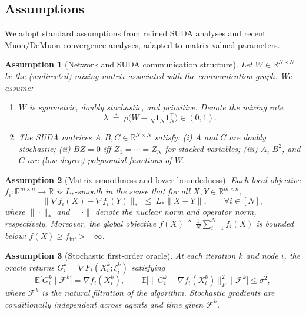 \documentclass{article}
\newtheorem{assumption}{Assumption}
\begin{document}
\subsection{Assumptions}

We adopt standard assumptions from refined SUDA analyses and recent Muon/DeMuon convergence analyses, adapted to matrix-valued parameters.

\begin{assumption}[Network and SUDA communication structure]
    \label{assump:network-suda}
    Let $W\in\mathbb{R}^{N\times N}$ be the (undirected) mixing matrix associated with the communication graph.
    We assume:
    \begin{enumerate}
        \vspace{-1mm}
        \item $W$ is symmetric, doubly stochastic, and primitive. Denote the mixing rate
        \[
            \lambda \;\triangleq\; \rho\Big(W-\tfrac{1}{N}\mathbf{1}_N\mathbf{1}_N^\top\Big)\in(0,1).
        \]
        \vspace{-1mm}
        \item The SUDA matrices $A,B,C\in\mathbb{R}^{N\times N}$ satisfy:
        (i) $A$ and $C$ are doubly stochastic; (ii) $BZ=0$ iff $Z_1=\cdots=Z_N$ for stacked variables;
        (iii) $A$, $B^2$, and $C$ are (low-degree) polynomial functions of $W$.
    \end{enumerate}
\end{assumption}

\begin{assumption}[Matrix smoothness and lower boundedness]
    \label{assump:smooth}
    Each local objective $f_i:\mathbb{R}^{m\times n}\to\mathbb{R}$ is $L_*$-smooth in the sense that for all $X,Y\in\mathbb{R}^{m\times n}$,
    \[
        \|\nabla f_i(X)-\nabla f_i(Y)\|_* \;\le\; L_* \|X-Y\|,
        \qquad \forall i\in[N],
    \]
    where $\|\cdot\|_*$ and $\|\cdot\|$ denote the nuclear norm and operator norm, respectively.
    Moreover, the global objective $f(X)\triangleq\frac{1}{N}\sum_{i=1}^N f_i(X)$ is bounded below: $f(X)\ge f_{\inf}>-\infty$.
\end{assumption}

\begin{assumption}[Stochastic first-order oracle]
    \label{assump:stoch}
    At each iteration $k$ and node $i$, the oracle returns
    $G_i^k=\nabla F_i(X_i^k;\xi_i^k)$ satisfying
    \[
        \mathbb{E}\big[G_i^k\mid\mathcal{F}^k\big]=\nabla f_i(X_i^k),\qquad
        \mathbb{E}\big[\|G_i^k-\nabla f_i(X_i^k)\|_F^2\mid\mathcal{F}^k\big]\le \sigma^2,
    \]
    where $\mathcal{F}^k$ is the natural filtration of the algorithm.
    Stochastic gradients are conditionally independent across agents and time given $\mathcal{F}^k$.
\end{assumption}
\end{document}

